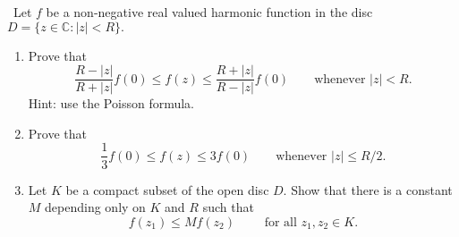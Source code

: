 \documentclass[12pt]{Qual}
\begin{document}
\begin{problem} $\,$
Let $f$ be a non-negative real valued harmonic function in the disc $D=\{z\in\mathbb{C}:|z|<R\}.$
\begin{enumerate}[label=(\alph*)]
    \item Prove that $$\frac{R-|z|}{R+|z|}f(0)\le f(z)\le\frac{R+|z|}{R-|z|}f(0)\qquad\text{whenever }|z|<R.$$ Hint: use the Poisson formula.
    \item Prove that $$\frac{1}{3}f(0)\le f(z)\le 3f(0)\qquad\text{whenever }|z|\le R/2.$$
    \item Let $K$ be a compact subset of the open disc $D.$ Show that there is a constant $M$ depending only on $K$ and $R$ such that $$f(z_1)\le Mf(z_2)\qquad\text{ for all }z_1,z_2\in K.$$
\end{enumerate}
\end{problem}
\end{document}
